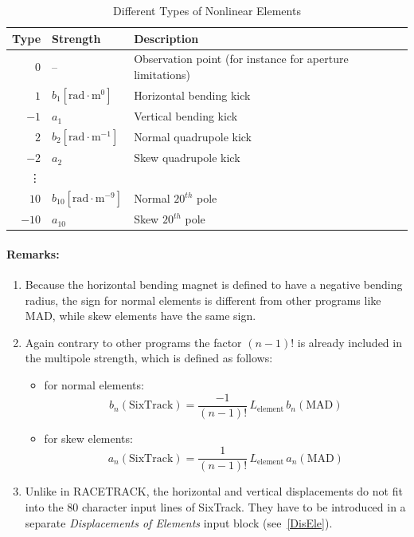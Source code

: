 \begin{table}[h]
    \caption{Different Types of Nonlinear Elements}
    \label{T-NonEle}
    \centering
    \begin{tabular}{|r|l|l|}
        \hline
        \rowcolor{blue!30}
        Type & Strength & Description \\
        \hline
        $0$ & -- & Observation point (for instance for aperture limitations) \\
        \hline
        $1$  & $b_{1} [\mathrm{rad} \cdot \mathrm{m}^{0}]$ & Horizontal bending kick \\
        $-1$ & $a_{1}$ & Vertical bending kick \\
        \hline
        $2$  & $b_{2} [\mathrm{rad} \cdot \mathrm{m}^{-1}]$ & Normal quadrupole kick \\
        $-2$ & $a_{2}$ & Skew quadrupole kick \\
        \hline
        \vdots & & \\
        \hline
        $10$  & $b_{10} [\mathrm{rad} \cdot \mathrm{m}^{-9}]$ & Normal $20^{th}$ pole \\
        $-10$ & $a_{10}$ & Skew $20^{th}$ pole \\
        \hline
    \end{tabular}
\end{table}

\paragraph{Remarks:}
\begin{enumerate}
    \item Because the horizontal bending magnet is defined to have a negative bending radius, the sign for normal elements is different from other programs like MAD, while skew elements have the same sign.
    \item Again contrary to other programs the factor \mbox{$(n-1)$!} is already included in the multipole strength, which is defined as follows:
    \begin{itemize}
        \item for normal elements:
        \begin{equation*}
            b_{n}(\mathrm{SixTrack}) = \frac{-1}{(n-1)!}\,L_{\mathrm{element}}\,b_{n}(\mathrm{MAD})
        \end{equation*}
        \item for skew elements:
        \begin{equation*}
            a_{n}(\mathrm{SixTrack}) = \frac{1}{(n-1)!}\,L_{\mathrm{element}}\,a_{n}(\mathrm{MAD})
        \end{equation*}
    \end{itemize}
    \item Unlike in RACETRACK, the horizontal and vertical displacements do not fit into the 80 character input lines of SixTrack\@. They have to be introduced in a separate \textit{Displacements of Elements} input block (see~\ref{DisEle}).
\end{enumerate}

